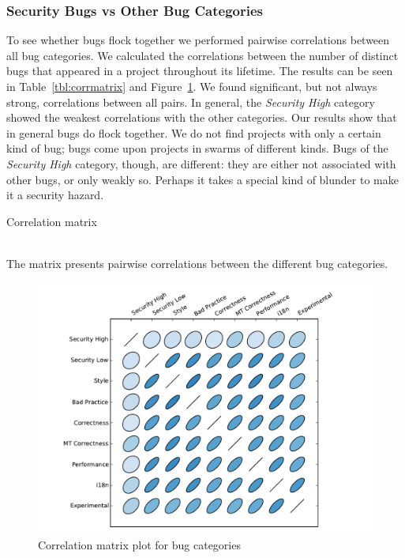 \documentclass[conference]{llncs}
\begin{document}
\subsubsection{Security Bugs {\sc vs} Other Bug Categories}

To see whether bugs flock together we performed pairwise correlations
between all bug categories. We calculated the correlations between the
number of distinct bugs that appeared in a project throughout its
lifetime. The results can be seen in Table~\ref{tbl:corrmatrix} and
Figure~\ref{fig:corrplot}. We found significant, but not always
strong, correlations between all pairs. In general, the {\it Security
  High} category showed the weakest correlations with the other
categories. Our results show that in general bugs do flock together.
We do not find projects with only a certain kind of bug; bugs come
upon projects in swarms of different kinds. Bugs of the {\it Security
  High} category, though, are different: they are either not
associated with other bugs, or only weakly so. Perhaps it takes a
special kind of blunder to make it a security hazard.

\begin{table}
    \centering
    \caption{Correlation matrix}
    \label{tbl:corrmatrix}
    
    \\
    \small The matrix presents pairwise correlations between the
        different bug categories.
\end{table}


\begin{figure}
  \centering
  \includegraphics[scale=0.6]{corrplot.pdf}
  \caption{Correlation matrix plot for bug categories}
  \label{fig:corrplot}
\end{figure}
\end{document}
